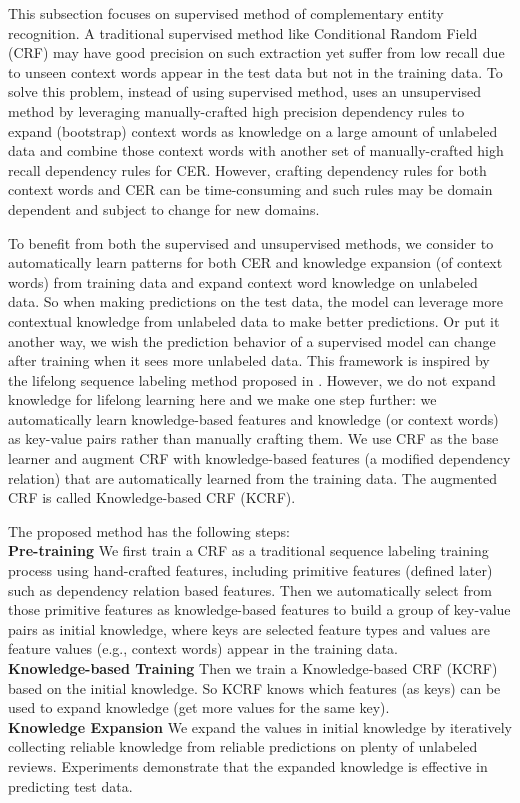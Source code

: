 This subsection focuses on supervised method of complementary entity recognition. A traditional supervised method like Conditional Random Field (CRF) may have good precision on such extraction yet suffer from low recall due to unseen context words appear in the test data but not in the training data. To solve this problem, instead of using supervised method, \cite{xu2016CER} uses an unsupervised method by leveraging manually-crafted high precision dependency rules \cite{bach2007review,culotta2004dependency,bunescu2005shortest,joshi2009generalizing} to expand (bootstrap) context words as knowledge on a large amount of unlabeled data and combine those context words with another set of manually-crafted high recall dependency rules for CER. However, crafting dependency rules for both context words and CER can be time-consuming and such rules may be domain dependent and subject to change for new domains.

To benefit from both the supervised and unsupervised methods, we consider to automatically learn patterns for both CER and knowledge expansion (of context words) from training data and expand context word knowledge on unlabeled data. So when making predictions on the test data, the model can leverage more contextual knowledge from unlabeled data to make better predictions. Or put it another way, we wish the prediction behavior of a supervised model can change after training when it sees more unlabeled data. This framework is inspired by the lifelong sequence labeling method proposed in \cite{shu2017lifelong,shu2016supervised}. However, we do not expand knowledge for lifelong learning here and we make one step further: we automatically learn knowledge-based features and knowledge (or context words) as key-value pairs rather than manually crafting them. We use CRF as the base learner and augment CRF with knowledge-based features (a modified dependency relation) that are automatically learned from the training data. The augmented CRF is called Knowledge-based CRF (KCRF).

The proposed method has the following steps:\\
\textbf{Pre-training} We first train a CRF as a traditional sequence labeling training process using hand-crafted features, including primitive features (defined later) such as dependency relation based features. Then we automatically select from those primitive features as knowledge-based features to build a group of key-value pairs as initial knowledge, where keys are selected feature types and values are feature values (e.g., context words) appear in the training data.\\ 
\textbf{Knowledge-based Training} Then we train a Knowledge-based CRF (KCRF) based on the initial knowledge. So KCRF knows which features (as keys) can be used to expand knowledge (get more values for the same key).\\
\textbf{Knowledge Expansion} We expand the values in initial knowledge by iteratively collecting reliable knowledge from reliable predictions on plenty of unlabeled reviews. Experiments demonstrate that the expanded knowledge is effective in predicting test data.

